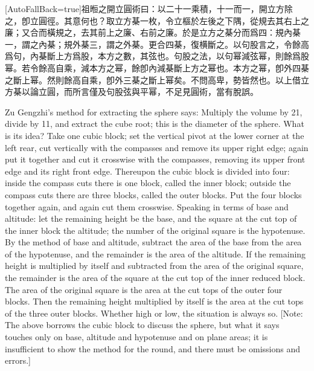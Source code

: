 \documentclass[11pt]{article}
\newcommand{\zhsmall}{\footnotesize\color{black!70}}
\newcommand{\unitlabel}[1]{\marginpar{\raggedleft\tiny\color{gray}#1}}
\newenvironment{unitzh}{\par\CJKfontspec{Noto Serif CJK SC}[AutoFallBack=true]\large\linespread{1.25}\selectfont}{\par}
\newenvironment{uniten}{\par\small\color{black!85}}{\par\medskip}
\begin{document}
\begin{unitzh}\unitlabel{jiuzhang-017.16}祖暅之開立圓術曰：以二十一乘積，十一而一，開立方除之，卽立圓徑。其意何也？取立方棊一枚，令立樞於左後之下隅，從規去其右上之廉；又合而橫規之，去其前上之廉、右前之廉。於是立方之棊分而爲四：規內棊一，謂之內棊；規外棊三，謂之外棊。更合四棊，復横斷之。以句股言之，令餘高爲句，內棊斷上方爲股，本方之數，其弦也。句股之法，以句幂減弦幂，則餘爲股幂。若令餘高自乘，減本方之幂，餘卽內減棊斷上方之幂也。本方之幂，卽外四棊之斷上幂。然則餘高自乘，卽外三棊之斷上幂矣。不問高卑，勢皆然也。{\zhsmall 以上借立方棊以論立圓，而所言僅及句股弦與平幂，不足見圓術，當有脫誤。}\end{unitzh}
\begin{uniten}Zu Gengzhi's method for extracting the sphere says: Multiply the volume by 21, divide by 11, and extract the cube root; this is the diameter of the sphere. What is its idea? Take one cubic block; set the vertical pivot at the lower corner at the left rear, cut vertically with the compasses and remove its upper right edge; again put it together and cut it crosswise with the compasses, removing its upper front edge and its right front edge. Thereupon the cubic block is divided into four: inside the compass cuts there is one block, called the inner block; outside the compass cuts there are three blocks, called the outer blocks. Put the four blocks together again, and again cut them crosswise. Speaking in terms of base and altitude: let the remaining height be the base, and the square at the cut top of the inner block the altitude; the number of the original square is the hypotenuse. By the method of base and altitude, subtract the area of the base from the area of the hypotenuse, and the remainder is the area of the altitude. If the remaining height is multiplied by itself and subtracted from the area of the original square, the remainder is the area of the square at the cut top of the inner reduced block. The area of the original square is the area at the cut tops of the outer four blocks. Then the remaining height multiplied by itself is the area at the cut tops of the three outer blocks. Whether high or low, the situation is always so. [Note: The above borrows the cubic block to discuss the sphere, but what it says touches only on base, altitude and hypotenuse and on plane areas; it is insufficient to show the method for the round, and there must be omissions and errors.]\end{uniten}
\end{document}
